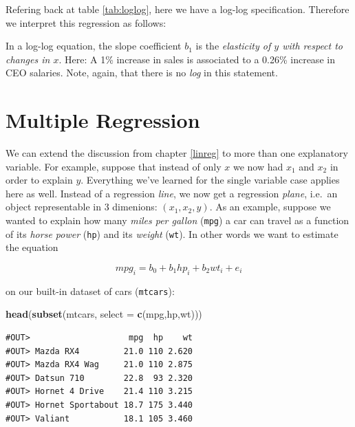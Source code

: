 \documentclass[]{book}
\newenvironment{Shaded}{\begin{snugshade}}{\end{snugshade}}
\newcommand{\KeywordTok}[1]{\textcolor[rgb]{0.13,0.29,0.53}{\textbf{#1}}}
\newcommand{\DataTypeTok}[1]{\textcolor[rgb]{0.13,0.29,0.53}{#1}}
\newcommand{\NormalTok}[1]{#1}
\newenvironment{tip}{\begin{tcolorbox}[colback=green!5!white,colframe=green]}{\end{tcolorbox}}
\begin{document}
Refering back at table \ref{tab:loglog}, here we have a log-log
specification. Therefore we interpret this regression as follows:

\begin{tip}
In a log-log equation, the slope coefficient \(b_1\) is the
\emph{elasticity of \(y\) with respect to changes in \(x\)}. Here: A 1\%
increase in sales is associated to a 0.26\% increase in CEO salaries.
Note, again, that there is no \emph{log} in this statement.
\end{tip}

\chapter{Multiple Regression}\label{multiple-reg}

We can extend the discussion from chapter \ref{linreg} to more than one
explanatory variable. For example, suppose that instead of only \(x\) we
now had \(x_1\) and \(x_2\) in order to explain \(y\). Everything we've
learned for the single variable case applies here as well. Instead of a
regression \emph{line}, we now get a regression \emph{plane}, i.e.~an
object representable in 3 dimenions: \((x_1,x_2,y)\). As an example,
suppose we wanted to explain how many \emph{miles per gallon}
(\texttt{mpg}) a car can travel as a function of its \emph{horse power}
(\texttt{hp}) and its \emph{weight} (\texttt{wt}). In other words we
want to estimate the equation

\begin{equation}
mpg_i = b_0 + b_1 hp_i + b_2 wt_i + e_i \label{eq:abline2d}
\end{equation}

on our built-in dataset of cars (\texttt{mtcars}):

\begin{Shaded}
\begin{Highlighting}[]
\KeywordTok{head}\NormalTok{(}\KeywordTok{subset}\NormalTok{(mtcars, }\DataTypeTok{select =} \KeywordTok{c}\NormalTok{(mpg,hp,wt)))}
\end{Highlighting}
\end{Shaded}

\begin{verbatim}
#OUT>                    mpg  hp    wt
#OUT> Mazda RX4         21.0 110 2.620
#OUT> Mazda RX4 Wag     21.0 110 2.875
#OUT> Datsun 710        22.8  93 2.320
#OUT> Hornet 4 Drive    21.4 110 3.215
#OUT> Hornet Sportabout 18.7 175 3.440
#OUT> Valiant           18.1 105 3.460
\end{verbatim}
\end{document}
